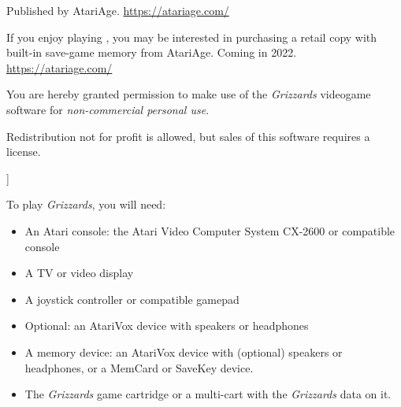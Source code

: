 \documentclass[10pt,twocolumn,openany,article]{memoir}
\begin{document}
\fi

Published by AtariAge. \href{https://atariage.com/}{https://atariage.com/}

\ifdefined\ATARIAGESAVE\else  If you  enjoy playing  ,
you  may  be  interested  in  purchasing a  retail  copy  with  built-in
save-game    memory    from    AtariAge.    Coming    in    2022.  
\href{https://atariage.com/}{https://atariage.com/}

\bigskip

You are hereby granted permission  to make use of the \textit{Grizzards}
videogame software for \emph{non-commercial personal use}.

Redistribution not for profit is allowed, but sales of this software
requires a license.

\fi

]

\let\cleardoublepage\clearpage

\mainmatter

\tableofcontents


To play \textit{Grizzards}, you will need:

\vspace{12pt}

\begin{itemize}
\item  An Atari  console: the  Atari  Video Computer  System CX-2600  or
  compatible console
\item A TV or video display
\item A joystick controller or compatible gamepad
  \ifdefined\ATARIAGESAVE
  \item Optional: an AtariVox device with speakers or headphones
  \else
  \ifdefined\NOSAVE\else
\item A  memory device: an  AtariVox device with (optional)  speakers or
  headphones, or a MemCard or SaveKey device.
  \fi\fi
\item The \textit{Grizzards} game cartridge \ifdefined\ATARIAGESAVE\else
  or a multi-cart with the \textit{Grizzards} data on it. \fi
\end{itemize}
\end{document}
